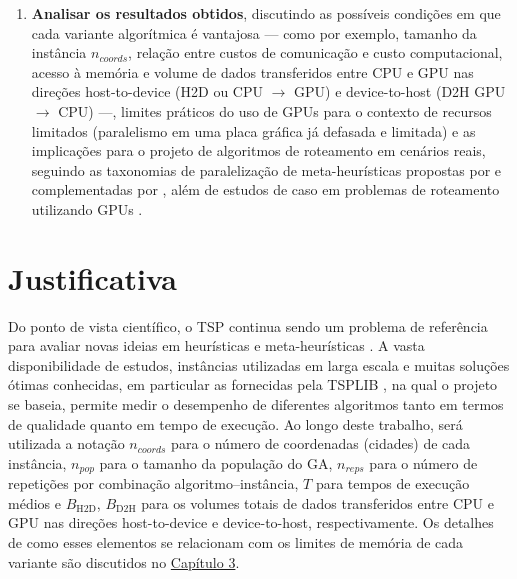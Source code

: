 \begin{enumerate}
            A metodologia estatística completa é apresentada no \hyperref[cap3-materiais-metodos]{Capítulo 3}.
      \item
            \textbf{Analisar os resultados obtidos}, discutindo as possíveis condições em que cada variante algorítmica é vantajosa — como por exemplo, tamanho da instância \(n_{coords}\), relação entre custos de comunicação e custo computacional, acesso à memória e volume de dados transferidos entre CPU e GPU nas direções host-to-device (H2D ou CPU \(\to\) GPU) e device-to-host (D2H GPU \(\to\) CPU) \autocite{nvidia2024cuda} —, limites práticos do uso de GPUs para o contexto de recursos limitados (paralelismo em uma placa gráfica já defasada e limitada) e as implicações para o projeto de algoritmos de roteamento em cenários reais, seguindo as taxonomias de paralelização de meta-heurísticas propostas por \textcite{crainic2003parallel} e complementadas por \textcite{alba2005parallel}, além de estudos de caso em problemas de roteamento utilizando GPUs \autocite{schulz2013gpu,tsp_gpu,fujimoto2011highly}.
\end{enumerate}

\section{Justificativa}\label{sec-15-justificativa}

Do ponto de vista científico, o TSP continua sendo um problema de referência para avaliar novas ideias em heurísticas e meta-heurísticas \autocite{cook2012pursuit}.
A vasta disponibilidade de estudos, instâncias utilizadas em larga escala e muitas soluções ótimas conhecidas, em particular as fornecidas pela TSPLIB \autocite{reinelt1991tsplib}, na qual o projeto se baseia, permite medir o desempenho de diferentes algoritmos tanto em termos de qualidade quanto em tempo de execução.
Ao longo deste trabalho, será utilizada a notação \(n_{coords}\) para o número de coordenadas (cidades) de cada instância, \(n_{pop}\) para o tamanho da população do GA, \(n_{reps}\) para o número de repetições por combinação algoritmo--instância, \(T\) para tempos de execução médios e \(B_{\mathrm{H2D}}\), \(B_{\mathrm{D2H}}\) para os volumes totais de dados transferidos entre CPU e GPU nas direções host-to-device e device-to-host, respectivamente.
Os detalhes de como esses elementos se relacionam com os limites de memória de cada variante são discutidos no \hyperref[cap3-materiais-metodos]{Capítulo 3}.

